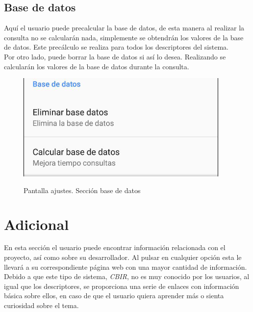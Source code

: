 \subsection{Base de datos}

Aquí el usuario puede precalcular la base de datos, de esta manera al realizar la consulta no se calcularán nada, simplemente se obtendrán los valores de la base de datos. Este precálculo se realiza para todos los descriptores del sistema.\\

Por otro lado, puede borrar la base de datos si así lo desea. Realizando se calcularán los valores de la base de datos durante la consulta.

\begin{figure}[H] %
\centering
\includegraphics[scale=0.5]{imagenes/ajustesbd.png}  %
\label{ajustesbd.png}
\caption{Pantalla ajustes. Sección base de datos}
\end{figure}

\section{Adicional}

En esta sección el usuario puede encontrar información relacionada con el proyecto, así como sobre su desarrollador. Al pulsar en cualquier opción esta le llevará a su correspondiente página web con una mayor cantidad de información.\\

Debido a que este tipo de sistema, \textit{CBIR}, no es muy conocido por los usuarios, al igual que los descriptores, se proporciona una serie de enlaces con información básica sobre ellos, en caso de que el usuario quiera aprender más o sienta curiosidad sobre el tema.

